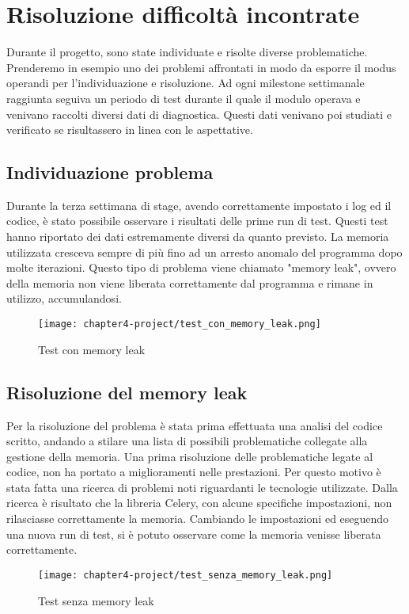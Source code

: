 \section{Risoluzione difficoltà incontrate}

Durante il progetto, sono state individuate e risolte diverse problematiche. Prenderemo in esempio uno dei problemi affrontati in modo da esporre il modus operandi per l'individuazione e risoluzione.
Ad ogni milestone settimanale raggiunta seguiva un periodo di test durante il quale il modulo operava e venivano raccolti diversi dati di diagnostica. Questi dati venivano poi studiati e verificato se risultassero in linea con le aspettative.

\subsection{Individuazione problema}
Durante la terza settimana di stage, avendo correttamente impostato i log ed il codice, è stato possibile osservare i risultati delle prime run di test. Questi test hanno riportato dei dati estremamente diversi da quanto previsto. La memoria utilizzata cresceva sempre di più fino ad un arresto anomalo del programma dopo molte iterazioni. Questo tipo di problema viene chiamato "memory leak", ovvero della memoria non viene liberata correttamente dal programma e rimane in utilizzo, accumulandosi.

\begin{figure}[!h] 
    \centering 
    \texttt{[image: chapter4-project/test\_con\_memory\_leak.png]} 
    \caption{Test con memory leak}
\end{figure}

\subsection{Risoluzione del memory leak}

Per la risoluzione del problema è stata prima effettuata una analisi del codice scritto, andando a stilare una lista di possibili problematiche collegate alla gestione della memoria. Una prima risoluzione delle problematiche legate al codice, non ha portato a miglioramenti nelle prestazioni. Per questo motivo è stata fatta una ricerca di problemi noti riguardanti le tecnologie utilizzate. Dalla ricerca è risultato che la libreria Celery, con alcune specifiche impostazioni, non rilasciasse correttamente la memoria. Cambiando le impostazioni ed eseguendo una nuova run di test, si è potuto osservare come la memoria venisse liberata correttamente.

\begin{figure}[!h] 
    \centering 
    \texttt{[image: chapter4-project/test\_senza\_memory\_leak.png]} 
    \caption{Test senza memory leak}
\end{figure}